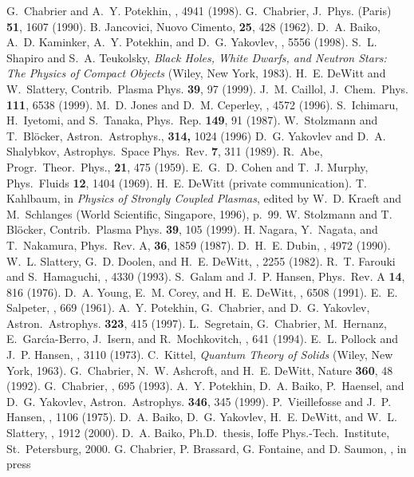 \begin{references}
G.~Chabrier and A.~Y. Potekhin,
, 4941 (1998).
G.~Chabrier,
J.\ Phys. (Paris) {\bf 51}, 1607 (1990).
B. Jancovici,
Nuovo Cimento, {\bf 25}, 428 (1962).
D.~A. Baiko, A.~D. Kaminker, A.~Y. Potekhin, and D.~G. Yakovlev,
, 5556 (1998).
S.~L. Shapiro and S.~A. Teukolsky,
{\it Black Holes, White Dwarfs, and Neutron Stars:
The Physics of Compact Objects} (Wiley, New York, 1983).
H.~E. DeWitt and W.~Slattery,
Contrib.\ Plasma Phys. {\bf 39}, 97 (1999).
J.~M. Caillol,
J.\ Chem.\ Phys. {\bf 111}, 6538 (1999).
M.~D. Jones and D.~M. Ceperley,
, 4572 (1996).
S.~Ichimaru, H.~Iyetomi, and S.~Tanaka,
Phys.\ Rep. {\bf 149}, 91 (1987).
W.~Stolzmann and T.~Bl\"ocker,
Astron.\ Astrophys., {\bf 314,} 1024 (1996)
D.~G. Yakovlev and D.~A. Shalybkov,
Astrophys.\ Space Phys.\ Rev. {\bf 7}, 311 (1989).
R.~Abe,
Progr.\ Theor.\ Phys., {\bf 21}, 475 (1959).
E.~G.~D. Cohen and T.~J. Murphy, 
Phys.\ Fluids {\bf 12}, 1404 (1969).
H.~E. DeWitt (private communication).
T. Kahlbaum, in
{\it Physics of Strongly Coupled Plasmas\/},
edited by W.~D. Kraeft and M.~Schlanges
(World Scientific, Singapore, 1996), p.~99.
W. Stolzmann and T. Bl\"ocker,
Contrib.\ Plasma Phys. {\bf 39}, 105 (1999).
H. Nagara, Y.~Nagata, and T.~Nakamura,
Phys.\ Rev. A, {\bf 36}, 1859 (1987).
D.~H.~E. Dubin, , 4972 (1990).
W.~L. Slattery, G.~D. Doolen, and H.~E. DeWitt,
, 2255 (1982).
R.~T. Farouki and S.~Hamaguchi,
, 4330 (1993).
S.~Galam and J.~P. Hansen,
Phys.\ Rev. A {\bf 14}, 816 (1976).
D.~A. Young, E.~M. Corey, and H.~E. DeWitt,
, 6508 (1991).
E.~E. Salpeter,
, 669 (1961).
A.~Y. Potekhin, G.~Chabrier, and D.~G. Yakovlev,
Astron.\ Astrophys. {\bf 323}, 415 (1997).
L.~Segretain, G.~Chabrier, M.~Hernanz, E.~Garc\'{\i}a-Berro,
J.~Isern, and R.~Mochkovitch,
, 641 (1994).
E.~L. Pollock and J.~P. Hansen,
, 3110 (1973).
C.~Kittel,
{\it Quantum Theory of Solids} 
(Wiley, New York, 1963).
G.~Chabrier, N.~W. Ashcroft, and H.~E. DeWitt,
Nature {\bf 360}, 48 (1992).
G.~Chabrier, , 695 (1993).
A.~Y. Potekhin, D.~A. Baiko, P.~Haensel, and D.~G. Yakovlev,
Astron.\ Astrophys. {\bf 346}, 345 (1999).
P.~Vieillefosse and J.~P. Hansen,
, 1106 (1975).
D.~A. Baiko, D.~G. Yakovlev, H.~E. DeWitt, and W.~L. Slattery,
, 1912 (2000).
D.~A. Baiko, 
Ph.D.\ thesis, Ioffe Phys.-Tech.\ Institute, St.\ Petersburg, 2000.
G. Chabrier, P. Brassard, G. Fontaine, and D. Saumon, \ApJ{}, in press
\end{references}

